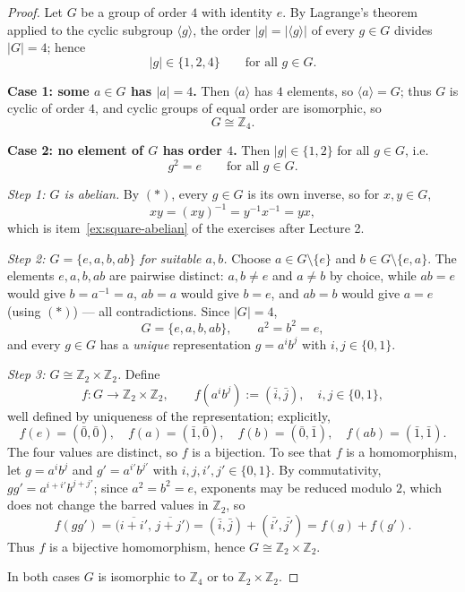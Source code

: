 \documentclass[11pt,a4paper]{article}
\newcommand{\Z}{\mathbb{Z}}
\begin{document}
\begin{proof}
    Let $G$ be a group of order $4$ with identity $e$. By Lagrange's theorem applied to the cyclic subgroup $\langle g \rangle$, the order $|g| = \big| \langle g \rangle \big|$ of every $g \in G$ divides $|G| = 4$; hence
    \[
        |g| \in \{1, 2, 4\} \qquad \text{for all } g \in G.
    \]
    
    \textbf{Case 1: some $a \in G$ has $|a| = 4$.}
    Then $\langle a \rangle$ has $4$ elements, so $\langle a \rangle = G$; thus $G$ is cyclic of order $4$, and cyclic groups of equal order are isomorphic, so
    \[
        G \cong \Z_4.
    \]
    
    \medskip
    \textbf{Case 2: no element of $G$ has order $4$.}
    Then $|g| \in \{1, 2\}$ for all $g \in G$, i.e.
    \[
        g^2 = e \qquad \text{for all } g \in G. \tag{$*$}
    \]
    
    \emph{Step 1: $G$ is abelian.}
    By $(*)$, every $g \in G$ is its own inverse, so for $x, y \in G$,
    \[
        xy = (xy)^{-1} = y^{-1} x^{-1} = yx,
    \]
    which is item~\ref{ex:square-abelian} of the exercises after Lecture 2.
    
    \emph{Step 2: $G = \{e, a, b, ab\}$ for suitable $a, b$.}
    Choose $a \in G \setminus \{e\}$ and $b \in G \setminus \{e, a\}$. The elements $e, a, b, ab$ are pairwise distinct: $a, b \neq e$ and $a \neq b$ by choice, while $ab = e$ would give $b = a^{-1} = a$, $ab = a$ would give $b = e$, and $ab = b$ would give $a = e$ (using $(*)$) --- all contradictions. Since $|G| = 4$,
    \[
        G = \{ e, a, b, ab \}, \qquad a^2 = b^2 = e,
    \]
    and every $g \in G$ has a \emph{unique} representation $g = a^i b^j$ with $i, j \in \{0, 1\}$.
    
    \emph{Step 3: $G \cong \Z_2 \times \Z_2$.}
    Define
    \[
        f \colon G \to \Z_2 \times \Z_2, \qquad f(a^i b^j) := (\bar{i}, \bar{j}), \quad i, j \in \{0, 1\},
    \]
    well defined by uniqueness of the representation; explicitly,
    \[
        f(e) = (\bar{0}, \bar{0}), \quad f(a) = (\bar{1}, \bar{0}), \quad f(b) = (\bar{0}, \bar{1}), \quad f(ab) = (\bar{1}, \bar{1}).
    \]
    The four values are distinct, so $f$ is a bijection. To see that $f$ is a homomorphism, let $g = a^i b^j$ and $g' = a^{i'} b^{j'}$ with $i, j, i', j' \in \{0, 1\}$. By commutativity, $gg' = a^{i+i'} b^{j+j'}$; since $a^2 = b^2 = e$, exponents may be reduced modulo $2$, which does not change the barred values in $\Z_2$, so
    \[
        f(gg') = \big( \overline{i + i'},\, \overline{j + j'} \big) = (\bar{i}, \bar{j}) + (\bar{i'}, \bar{j'}) = f(g) + f(g').
    \]
    Thus $f$ is a bijective homomorphism, hence $G \cong \Z_2 \times \Z_2$.
    
    In both cases $G$ is isomorphic to $\Z_4$ or to $\Z_2 \times \Z_2$.
\end{proof}
\end{document}
